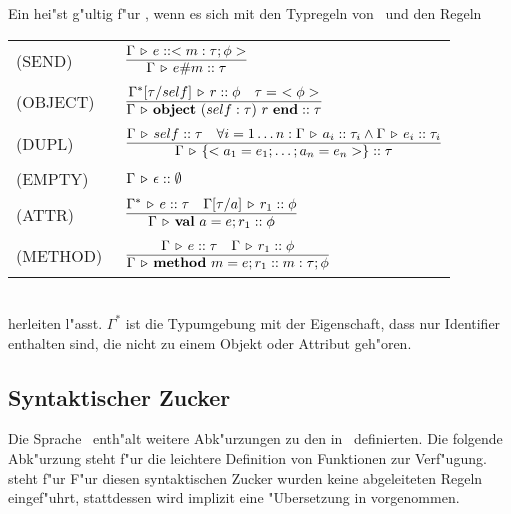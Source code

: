 Ein  hei"st g"ultig f"ur \LTWOO, wenn es sich mit den Typregeln von \LTWO\ und den Regeln\\[3mm]
\begin{tabular}{ll}
  \mbox{(SEND)\   } & $\regel{\Tj{\Gamma}{e}{<m:\tau;\phi>}}
                           {\Tj{\Gamma}{\send{e}{m}}{\tau}}$\\[5mm]
  \mbox{(OBJECT)\ } & $\regel{\Tj{\Gamma^*[\tau/self]}{r}{\phi}
                             \quad \tau =\ \objecttype{\phi}}
                             {\Tj{\Gamma}{\object{self:\tau}{r}}{\tau}}$\\[5mm]
  \mbox{(DUPL)\   } & $\regel{\Tj{\Gamma}{self}{\tau}
                              \quad \forall i = 1 \ldots n :
                              \Tj{\Gamma}{a_i}{\tau_i} \wedge
                              \Tj{\Gamma}{e_i}{\tau_i}}
                             {\Tj{\Gamma}{\{< a_1 = e_1;\ldots;a_n = e_n >\}}{\tau}}$\\[5mm]
  \mbox{(EMPTY)\  } & $\Gamma \, \triangleright \, \epsilon\mathrel{::}\emptyset$\\[5mm]
  \mbox{(ATTR)\   } & $\regel{\Tj{\Gamma^*}{e}{\tau}
                              \quad \Tj{\Gamma[\tau/a]}{r_1}{\phi}}
                             {\Tj{\Gamma}{\val{a}{e}r_1}{\phi}}$ \\[5mm]
  \mbox{(METHOD)\ } & $\regel{\Tj{\Gamma}{e}{\tau}
                              \quad \Tj{\Gamma}{r_1}{\phi}}
                             {\Tj{\Gamma}{\method{m}{e}r_1}{m:\tau;\phi}}$
\end{tabular}\\[7mm]
herleiten l"asst. $\Gamma^*$ ist die Typumgebung mit der Eigenschaft, dass nur Identifier enthalten sind,
die nicht zu einem Objekt oder Attribut geh"oren.


\subsection{Syntaktischer Zucker}

Die Sprache \LTWOO\ enth"alt weitere Abk"urzungen zu den in \LTWO\ definierten. Die folgende Abk"urzung steht f"ur die leichtere Definition von Funktionen zur Verf"ugung.
\beqns
\eeqns
steht f"ur
\beqns
\eeqns
F"ur diesen syntaktischen Zucker wurden keine abgeleiteten Regeln eingef"uhrt, stattdessen wird implizit
eine "Ubersetzung in  vorgenommen.


